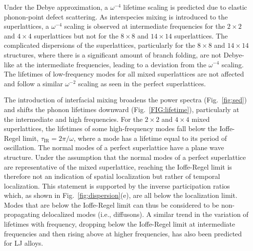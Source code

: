 \documentclass[aps,prb,preprint,preprintnumbers,amsmath,amssymb,floatfix,superscriptaddress]{revtex4}
\newcommand{\kv}{\mspace{-4.0mu}\left(\mspace{-8.0mu}
\begin{smallmatrix}&\pmb{\kappa} \\&\nu\end{smallmatrix}
\mspace{-3.0mu}\right)}
\begin{document}

Under the Debye approximation, a $\omega^{-4}$ lifetime scaling is predicted due to elastic phonon-point defect scattering.\cite{PhysRev.140.A1812,klemens_scattering_1955-3, klemens_thermal_1957-2} As interspecies mixing is introduced to the superlattices, a $\omega^{-4}$ scaling is observed at intermediate frequencies for the $2\times2$ and $4\times4$ superlattices but not for the $8\times8$ and $14\times14$ superlattices. The complicated dispersions of the superlattices, particularly for the $8\times8$ and $14\times14$ structures, where there is a significant amount of branch folding, are not Debye-like at the intermediate frequencies, leading to a deviation from the $\omega^{-4}$ scaling. The lifetimes of low-frequency modes for all mixed superlattices are not affected and follow a similar $\omega^{-2}$ scaling as seen in the perfect superlattices.

The introduction of interfacial mixing broadens the power spectra (Fig.~\ref{fig:sed}) and shifts the phonon lifetimes downward (Fig.~\ref{FIG:lifetime}), particularly at the intermediate and high frequencies. For the $2 \times 2$ and $ 4 \times 4$ mixed superlattices,  the lifetimes of some high-frequency modes fall below the Ioffe-Regel limit, $\tau_\mathrm{IR} =2\pi/\omega$, where a mode has a lifetime equal to its period of oscillation. The normal modes of a perfect superlattice have a plane wave structure. Under the assumption that the normal modes of a perfect superlattice are representative of the mixed superlattice, reaching the Ioffe-Regel limit is therefore not an indication of spatial localization but rather of temporal localization. This statement is supported by the inverse participation ratios which, as shown in Fig.~\ref{fig:dispersion}(e), are all below the localization limit. Modes that are below the Ioffe-Regel limit can thus be considered to be non-propagating delocalized modes (i.e., diffusons).\cite{allen_thermal_1993,allen1999diffusons} A similar trend in the variation of lifetimes with frequency, dropping below the Ioffe-Regel limit at intermediate frequencies and then rising above at higher frequencies, has also been predicted for LJ alloys.\cite{larkin2013predicting} %
\end{document}
